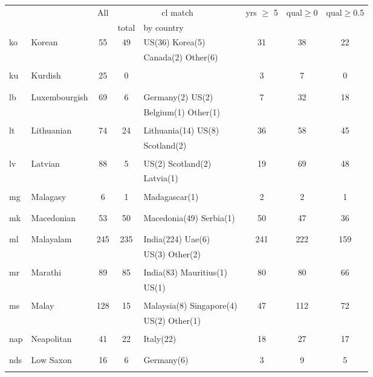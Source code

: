 \begin{figure}[h]
\centering
\begin{tabular}{llcclccc}
&&All&\multicolumn{2}{c}{cl match}&yrs $\geq$ 5&qual$\geq$0&qual$\geq$0.5\\
&&&total&by country&&\\
\hline\hline
ko&Korean&55&49&US(36) Korea(5) &31&38&22\\
&&&&Canada(2) Other(6) &&&\\
&&&&&&&\\
ku&Kurdish&25&0&&3&7&0\\
&&&&&&&\\
&&&&&&&\\
lb&Luxembourgish&69&6&Germany(2) US(2) &7&32&18\\
&&&&Belgium(1) Other(1) &&&\\
&&&&&&&\\
lt&Lithuanian&74&24&Lithuania(14) US(8) &36&58&45\\
&&&&Scotland(2) &&&\\
&&&&&&&\\
lv&Latvian&88&5&US(2) Scotland(2) &19&69&48\\
&&&&Latvia(1) &&&\\
&&&&&&&\\
mg&Malagasy&6&1&Madagascar(1) &2&2&1\\
&&&&&&&\\
&&&&&&&\\
mk&Macedonian&53&50&Macedonia(49) Serbia(1) &50&47&36\\
&&&&&&&\\
&&&&&&&\\
ml&Malayalam&245&235&India(224) Uae(6) &241&222&159\\
&&&&US(3) Other(2) &&&\\
&&&&&&&\\
mr&Marathi&89&85&India(83) Mauritius(1) &80&80&66\\
&&&&US(1) &&&\\
&&&&&&&\\
ms&Malay&128&15&Malaysia(8) Singapore(4) &47&112&72\\
&&&&US(2) Other(1) &&&\\
&&&&&&&\\
nap&Neapolitan&41&22&Italy(22) &18&27&17\\
&&&&&&&\\
&&&&&&&\\
nds&Low Saxon&16&6&Germany(6) &3&9&5\\
&&&&&&&\\

\end{tabular}
\end{figure}
